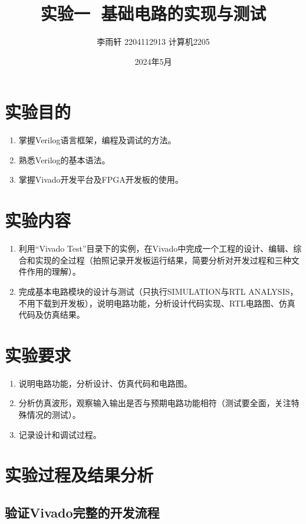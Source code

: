 \documentclass[a4,10pt,zihao=-4]{ctexart}
\begin{document}
\title{实验一\,\,\,\,基础电路的实现与测试}

\author{李雨轩 2204112913 计算机2205}
\date{2024年5月}
\maketitle

\section{实验目的}
\begin{enumerate}
  \item 掌握Verilog语言框架，编程及调试的方法。
  \item 熟悉Verilog的基本语法。
  \item 掌握Vivado开发平台及FPGA开发板的使用。
\end{enumerate}

\section{实验内容}
\begin{enumerate}
  \item 利用“Vivado Test”目录下的实例，在Vivado中完成一个工程的设计、编辑、综合和实现的全过程（拍照记录开发板运行结果，简要分析对开发过程和三种文件作用的理解）。
  \item 完成基本电路模块的设计与测试（只执行SIMULATION与RTL ANALYSIS，不用下载到开发板），说明电路功能，分析设计代码实现、RTL电路图、仿真代码及仿真结果。
\end{enumerate}

\section{实验要求}
\begin{enumerate}
  \item 说明电路功能，分析设计、仿真代码和电路图。
  \item 分析仿真波形，观察输入输出是否与预期电路功能相符（测试要全面，关注特殊情况的测试）。
  \item 记录设计和调试过程。
\end{enumerate}

\section{实验过程及结果分析}
\subsection{验证Vivado完整的开发流程}
\end{document}
